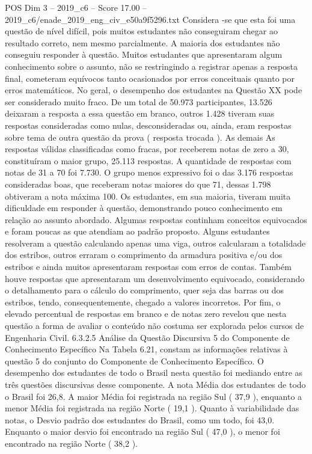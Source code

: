 \begin{textsample}{POS Dim 3 – 2019\_c6 – Score 17.00 – 2019\_c6/enade\_2019\_eng\_civ\_e50a9f5296.txt}
Considera -se que esta foi uma questão de nível difícil, pois muitos estudantes não conseguiram chegar ao resultado correto, nem mesmo parcialmente.
A maioria dos estudantes não conseguiu responder à questão.
Muitos estudantes que apresentaram algum conhecimento sobre o assunto, não se restringindo a registrar apenas a resposta final, cometeram equívocos tanto ocasionados por erros conceituais quanto por erros matemáticos.
No geral, o desempenho dos estudantes na Questão XX pode ser considerado muito fraco.
De um total de 50.973 participantes, 13.526 deixaram a resposta a essa questão em branco, outros 1.428 tiveram suas respostas consideradas como nulas, desconsideradas ou, ainda, eram respostas sobre tema de outra questão da prova ( resposta trocada ).
As demais As respostas válidas classificadas como fracas, por receberem notas de zero a 30, constituíram o maior grupo, 25.113 respostas.
A quantidade de respostas com notas de 31 a 70 foi 7.730.
O grupo menos expressivo foi o das 3.176 respostas consideradas boas, que receberam notas maiores do que 71, dessas 1.798 obtiveram a nota máxima 100.
Os estudantes, em sua maioria, tiveram muita dificuldade em responder à questão, demonstrando pouco conhecimento em relação ao assunto abordado.
Algumas respostas continham conceitos equivocados e foram poucas as que atendiam ao padrão proposto.
Alguns estudantes resolveram a questão calculando apenas uma viga, outros calcularam a totalidade dos estribos, outros erraram o comprimento da armadura positiva e/ou dos estribos e ainda muitos apresentaram respostas com erros de contas.
Também houve respostas que apresentaram um desenvolvimento equivocado, considerando o detalhamento para o cálculo do comprimento, quer seja das barras ou dos estribos, tendo, consequentemente, chegado a valores incorretos.
Por fim, o elevado percentual de respostas em branco e de notas zero revelou que nesta questão a forma de avaliar o conteúdo não costuma ser explorada pelos cursos de Engenharia Civil. 6.3.2.5 Análise da Questão Discursiva 5 do Componente de Conhecimento Específico Na Tabela 6.21, constam as informações relativas à questão 5 do conjunto do Componente de Conhecimento Específico.
O desempenho dos estudantes de todo o Brasil nesta questão foi mediando entre as três questões discursivas desse componente.
A nota Média dos estudantes de todo o Brasil foi 26,8.
A maior Média foi registrada na região Sul ( 37,9 ), enquanto a menor Média foi registrada na região Norte ( 19,1 ).
Quanto à variabilidade das notas, o Desvio padrão dos estudantes do Brasil, como um todo, foi 43,0.
Enquanto o maior desvio foi encontrado na região Sul ( 47,0 ), o menor foi encontrado na região Norte ( 38,2 ).

\end{textsample}
